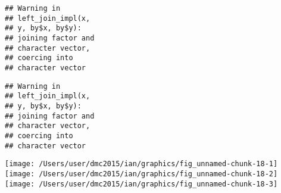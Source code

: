 \documentclass[10pt]{report}
\newenvironment{Shaded}{}{}
\newcommand{\KeywordTok}[1]{\textcolor[rgb]{0.00,0.44,0.13}{\textbf{{#1}}}}
\newcommand{\DataTypeTok}[1]{\textcolor[rgb]{0.56,0.13,0.00}{{#1}}}
\newcommand{\StringTok}[1]{\textcolor[rgb]{0.25,0.44,0.63}{{#1}}}
\newcommand{\NormalTok}[1]{{#1}}
\begin{document}
\begin{Shaded}
\end{Shaded}

\begin{verbatim}
## Warning in
## left_join_impl(x,
## y, by$x, by$y):
## joining factor and
## character vector,
## coercing into
## character vector
\end{verbatim}

\begin{verbatim}
## Warning in
## left_join_impl(x,
## y, by$x, by$y):
## joining factor and
## character vector,
## coercing into
## character vector
\end{verbatim}

\begin{Shaded}
\end{Shaded}

\begin{center}\texttt{[image: /Users/user/dmc2015/ian/graphics/fig\_unnamed-chunk-18-1]} \texttt{[image: /Users/user/dmc2015/ian/graphics/fig\_unnamed-chunk-18-2]} \texttt{[image: /Users/user/dmc2015/ian/graphics/fig\_unnamed-chunk-18-3]} \end{center}
\end{document}
